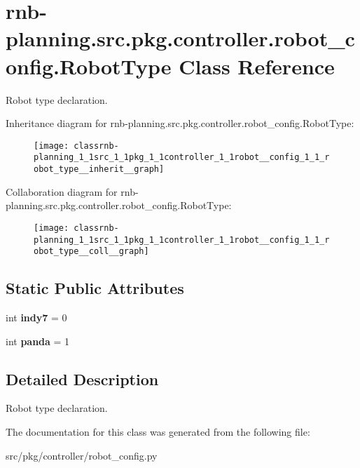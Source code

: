 \hypertarget{classrnb-planning_1_1src_1_1pkg_1_1controller_1_1robot__config_1_1_robot_type}{}\section{rnb-\/planning.src.\+pkg.\+controller.\+robot\+\_\+config.\+Robot\+Type Class Reference}
\label{classrnb-planning_1_1src_1_1pkg_1_1controller_1_1robot__config_1_1_robot_type}


Robot type declaration.  




Inheritance diagram for rnb-\/planning.src.\+pkg.\+controller.\+robot\+\_\+config.\+Robot\+Type\+:\nopagebreak
\begin{figure}[H]
\begin{center}
\leavevmode
\texttt{[image: classrnb-planning\_1\_1src\_1\_1pkg\_1\_1controller\_1\_1robot\_\_config\_1\_1\_robot\_type\_\_inherit\_\_graph]}
\end{center}
\end{figure}


Collaboration diagram for rnb-\/planning.src.\+pkg.\+controller.\+robot\+\_\+config.\+Robot\+Type\+:\nopagebreak
\begin{figure}[H]
\begin{center}
\leavevmode
\texttt{[image: classrnb-planning\_1\_1src\_1\_1pkg\_1\_1controller\_1\_1robot\_\_config\_1\_1\_robot\_type\_\_coll\_\_graph]}
\end{center}
\end{figure}
\subsection*{Static Public Attributes}
\begin{DoxyCompactItemize}
\item 
\mbox{\label{classrnb-planning_1_1src_1_1pkg_1_1controller_1_1robot__config_1_1_robot_type_a2ea99952cada8f9133c88c4d026a45aa}} 
int {\bfseries indy7} = 0
\item 
\mbox{\label{classrnb-planning_1_1src_1_1pkg_1_1controller_1_1robot__config_1_1_robot_type_a7579da07da0123ca88734411c241d786}} 
int {\bfseries panda} = 1
\end{DoxyCompactItemize}


\subsection{Detailed Description}
Robot type declaration. 

The documentation for this class was generated from the following file\+:\begin{DoxyCompactItemize}
\item 
src/pkg/controller/robot\+\_\+config.\+py\end{DoxyCompactItemize}

